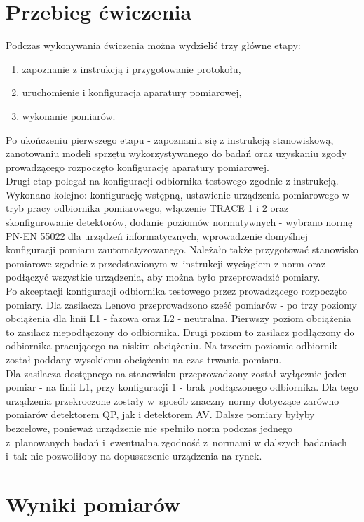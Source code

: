 \documentclass[12pt, a4paper, oneside]{article}
\begin{document}
\section{Przebieg ćwiczenia}
\indent\indent Podczas wykonywania ćwiczenia można wydzielić trzy główne etapy:
\begin{enumerate}
\item zapoznanie z instrukcją i przygotowanie protokołu,
\item uruchomienie i konfiguracja aparatury pomiarowej,
\item wykonanie pomiarów.
\end{enumerate}
\indent\indent Po ukończeniu pierwszego etapu - zapoznaniu się z instrukcją stanowiskową, zanotowaniu modeli sprzętu wykorzystywanego do badań oraz uzyskaniu zgody prowadzącego rozpoczęto konfigurację aparatury pomiarowej.\\
\indent Drugi etap polegał na konfiguracji odbiornika testowego zgodnie z instrukcją. Wykonano kolejno: konfigurację wstępną, ustawienie urządzenia pomiarowego w tryb pracy odbiornika pomiarowego, włączenie TRACE 1 i 2 oraz skonfigurowanie detektorów, dodanie poziomów normatywnych - wybrano normę PN-EN 55022 dla urządzeń informatycznych, wprowadzenie domyślnej konfiguracji pomiaru zautomatyzowanego. Należało także przygotować stanowisko pomiarowe zgodnie z przedstawionym w~instrukcji wyciągiem z norm oraz podłączyć wszystkie urządzenia, aby można było przeprowadzić pomiary.\\
\indent Po akceptacji konfiguracji odbiornika testowego przez prowadzącego rozpoczęto pomiary. Dla zasilacza Lenovo przeprowadzono sześć pomiarów - po trzy poziomy obciążenia dla linii L1 - fazowa oraz L2 - neutralna. Pierwszy poziom obciążenia to zasilacz niepodłączony do odbiornika. Drugi poziom to zasilacz podłączony do odbiornika pracującego na niskim obciążeniu. Na trzecim poziomie odbiornik został poddany wysokiemu obciążeniu na czas trwania pomiaru.\\
Dla zasilacza dostępnego na stanowisku przeprowadzony został wyłącznie jeden pomiar - na linii L1, przy konfiguracji 1 - brak podłączonego odbiornika. Dla tego urządzenia przekroczone zostały w~sposób znaczny normy dotyczące zarówno pomiarów detektorem QP, jak i detektorem AV. Dalsze pomiary byłyby bezcelowe, ponieważ urządzenie nie spełniło norm podczas jednego z~planowanych badań i~ewentualna zgodność z~normami w dalszych badaniach i~tak nie pozwoliłoby na dopuszczenie urządzenia na rynek.
\clearpage
\section{Wyniki pomiarów}
\end{document}
